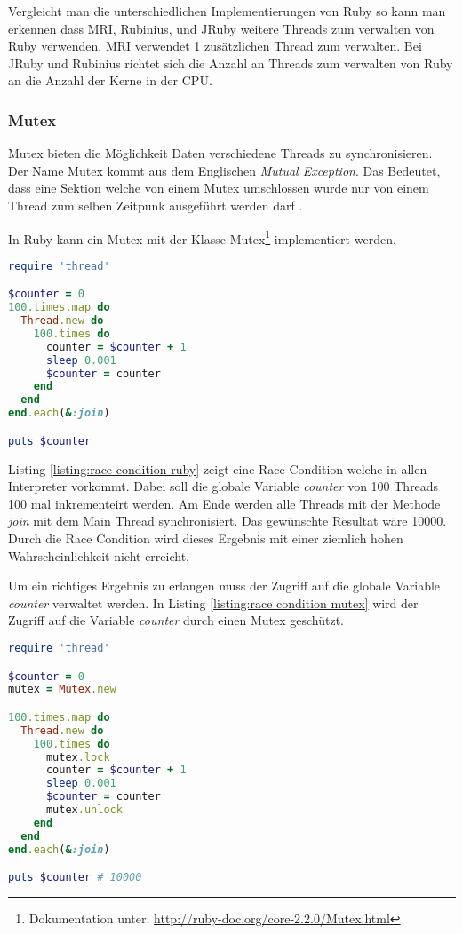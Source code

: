 Vergleicht man die unterschiedlichen Implementierungen von Ruby so kann man erkennen dass MRI, Rubinius, und JRuby weitere Threads zum verwalten von Ruby verwenden. MRI verwendet 1 zusätzlichen Thread zum verwalten. Bei JRuby und Rubinius richtet sich die Anzahl an Threads zum verwalten von Ruby an die Anzahl der Kerne in der CPU.

\subsubsection{Mutex}
Mutex bieten die Möglichkeit Daten verschiedene Threads zu synchronisieren. Der Name Mutex kommt aus dem Englischen \emph{Mutual Exception}. Das Bedeutet, dass eine Sektion welche von einem Mutex umschlossen wurde nur von einem Thread zum selben Zeitpunk ausgeführt werden darf \cite[p. 81]{Sto2013}. 

In Ruby kann ein Mutex mit der Klasse Mutex\footnote{Dokumentation unter:  \url{http://ruby-doc.org/core-2.2.0/Mutex.html}} implementiert werden.

\begin{lstlisting}[language=Ruby,label={listing:race condition ruby}]
require 'thread'

$counter = 0
100.times.map do
  Thread.new do
    100.times do
      counter = $counter + 1
      sleep 0.001
      $counter = counter
    end
  end
end.each(&:join)

puts $counter
\end{lstlisting}

Listing \ref{listing:race condition ruby} zeigt eine Race Condition welche in allen Interpreter vorkommt. Dabei soll die globale Variable \emph{counter} von 100 Threads 100 mal inkrementeirt werden. Am Ende werden alle Threads mit der Methode \emph{join} mit dem Main Thread synchronisiert. Das gewünschte Resultat wäre 10000. Durch die Race Condition wird dieses Ergebnis mit einer ziemlich hohen Wahrscheinlichkeit nicht erreicht.

Um ein richtiges Ergebnis zu erlangen muss der Zugriff auf die globale Variable \emph{counter} verwaltet werden. In Listing \ref{listing:race condition mutex} wird der Zugriff auf die Variable \emph{counter} durch einen Mutex geschützt. 

\begin{lstlisting}[language=Ruby,label={listing:race condition mutex}]
require 'thread'

$counter = 0
mutex = Mutex.new

100.times.map do
  Thread.new do
    100.times do
      mutex.lock
      counter = $counter + 1
      sleep 0.001
      $counter = counter
      mutex.unlock
    end
  end
end.each(&:join)

puts $counter # 10000
\end{lstlisting}

